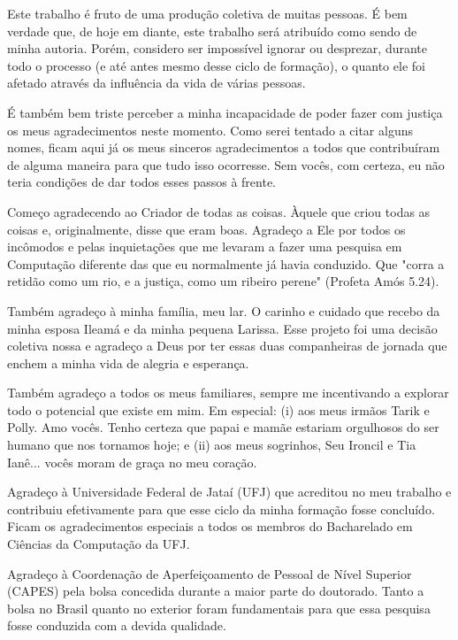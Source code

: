 \begin{agradecimentos}

Este trabalho é fruto de uma produção coletiva de muitas pessoas. É bem verdade que, de hoje em diante, este trabalho será atribuído como sendo de minha autoria. Porém, considero ser impossível ignorar ou desprezar, durante todo o processo (e até antes mesmo desse ciclo de formação), o quanto ele foi afetado através da influência da vida de várias pessoas.

É também bem triste perceber a minha incapacidade de poder fazer com justiça os meus agradecimentos neste momento. Como serei tentado a citar alguns nomes, ficam aqui já os meus sinceros agradecimentos a todos que contribuíram de alguma maneira para que tudo isso ocorresse. Sem vocês, com certeza, eu não teria condições de dar todos esses passos à frente.

Começo agradecendo ao Criador de todas as coisas. Àquele que criou todas as coisas e, ori\-ginalmente, disse que eram boas. Agradeço a Ele por todos os incômodos e pelas inquietações que me levaram a fazer uma pesquisa em Computação diferente das que eu normalmente já havia conduzido. Que "corra a retidão como um rio, e a justiça, como um ribeiro perene" (Profeta Amós 5.24).

Também agradeço à minha família, meu lar. O carinho e cuidado que recebo da minha esposa Ileamá e da minha pequena Larissa. Esse projeto foi uma decisão coletiva nossa e agradeço a Deus por ter essas duas companheiras de jornada que enchem a minha vida de alegria e esperança.

Também agradeço a todos os meus familiares, sempre me incentivando a explorar todo o potencial que existe em mim. Em especial: (i) aos meus irmãos Tarik e Polly. Amo vocês. Tenho certeza que papai e mamãe estariam orgulhosos do ser humano que nos tornamos hoje; e (ii) aos meus sogrinhos, Seu Ironcil e Tia Ianê... vocês moram de graça no meu coração.

Agradeço à Universidade Federal de Jataí (UFJ) que acreditou no meu trabalho e contribuiu efetivamente para que esse ciclo da minha formação fosse concluído. Ficam os agradecimentos especiais a todos os membros do Bacharelado em Ciências da Computação da UFJ.

Agradeço à Coordenação de Aperfeiçoamento de Pessoal de Nível Superior (CAPES) pela bolsa concedida durante a maior parte do doutorado. Tanto a bolsa no Brasil quanto no exterior foram fundamentais para que essa pesquisa fosse conduzida com a devida qualidade.


\end{agradecimentos}
